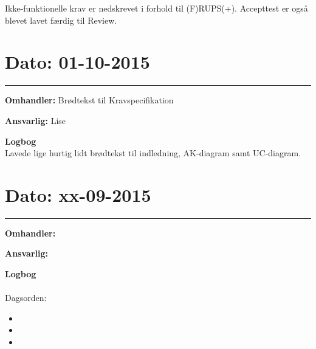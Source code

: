 Ikke-funktionelle krav er nedskrevet i forhold til (F)RUPS(+). Accepttest er også blevet lavet færdig til Review. 


\section{Dato: 01-10-2015 }
\hrule

\textbf{Omhandler:} Brødtekst til Kravspecifikation 

\textbf{Ansvarlig:} Lise 

\textbf{Logbog}
\\
Lavede lige hurtig lidt brødtekst til indledning, AK-diagram samt UC-diagram. 


\section{Dato: xx-09-2015 }
\hrule

\textbf{Omhandler:}  

\textbf{Ansvarlig:} 

\textbf{Logbog}
\\
\\
Dagsorden:
\begin{itemize}
	\item 
	\item 
	\item 
\end{itemize}